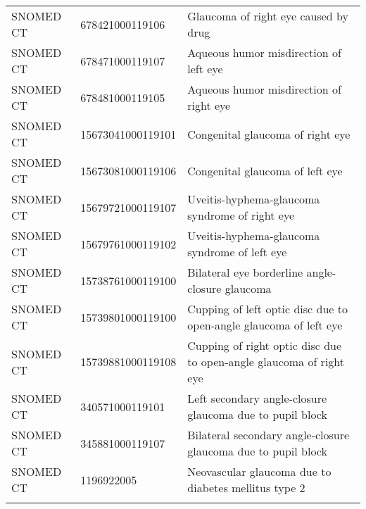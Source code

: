 \begin{longtable}{p{}p{}p{}}
  SNOMED CT & 678421000119106 & Glaucoma of right eye caused by drug \\ 
  SNOMED CT & 678471000119107 & Aqueous humor misdirection of left eye \\ 
  SNOMED CT & 678481000119105 & Aqueous humor misdirection of right eye \\ 
  SNOMED CT & 15673041000119101 & Congenital glaucoma of right eye \\ 
  SNOMED CT & 15673081000119106 & Congenital glaucoma of left eye \\ 
  SNOMED CT & 15679721000119107 & Uveitis-hyphema-glaucoma syndrome of right eye \\ 
  SNOMED CT & 15679761000119102 & Uveitis-hyphema-glaucoma syndrome of left eye \\ 
  SNOMED CT & 15738761000119100 & Bilateral eye borderline angle-closure glaucoma \\ 
  SNOMED CT & 15739801000119100 & Cupping of left optic disc due to open-angle glaucoma of left eye \\ 
  SNOMED CT & 15739881000119108 & Cupping of right optic disc due to open-angle glaucoma of right eye \\ 
  SNOMED CT & 340571000119101 & Left secondary angle-closure glaucoma due to pupil block \\ 
  SNOMED CT & 345881000119107 & Bilateral secondary angle-closure glaucoma due to pupil block \\ 
  SNOMED CT & 1196922005 & Neovascular glaucoma due to diabetes mellitus type 2 \\ 
  \hline
\label{tab:codes_glaucoma}
\end{longtable}
